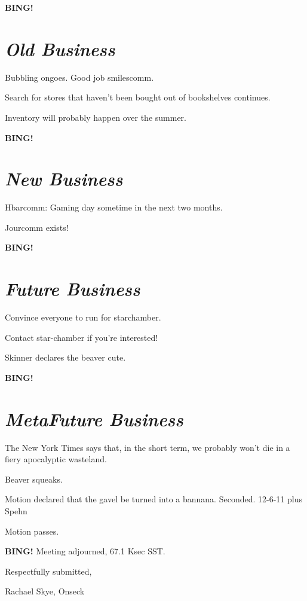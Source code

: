 \documentclass[10pt]{article}
\newcommand{\bing}{{\bf BING!} }
\newcommand{\goto}[1]{\bing \vskip 12pt \section*{{\em{#1}}}}
\newcommand{\ps}{ plus Spehn\xspace}
\newcommand{\onseck}{Rachael Skye, Onseck}
\begin{document}
\goto{Old Business}

Bubbling ongoes. Good job smilescomm.

Search for stores that haven't been bought out of bookshelves continues.

Inventory will probably happen over the summer.

\goto{New Business}

Hbarcomm: Gaming day sometime in the next two months.

Jourcomm exists!

\goto{Future Business}

Convince everyone to run for starchamber.

Contact star-chamber if you're interested!

Skinner declares the beaver cute.

\goto{MetaFuture Business}

The New York Times says that, in the short term, we probably won't die in a fiery apocalyptic wasteland.

Beaver squeaks.

Motion declared that the gavel be turned into a bannana.
Seconded.
12-6-11 \ps

Motion passes.

\bing
\noindent
Meeting adjourned, 67.1 Ksec SST.

\vspace{18pt}

\centerline{Respectfully submitted,}
\centerline{\onseck}
\end{document}

